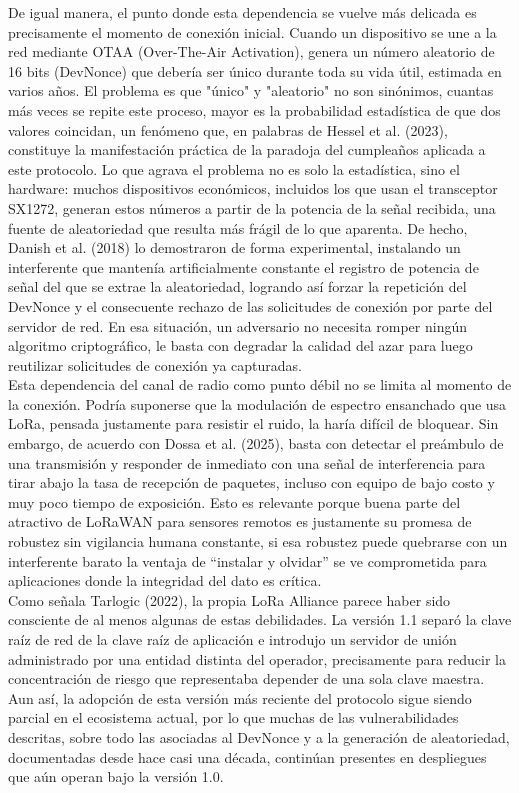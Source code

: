 \documentclass[12pt,a4paper]{article}
\begin{document}
	De igual manera, el punto donde esta dependencia se vuelve más delicada es precisamente el momento de conexión inicial. Cuando un dispositivo se une a la red mediante OTAA (Over-The-Air Activation), genera un número aleatorio de 16 bits (DevNonce) que debería ser único durante toda su vida útil, estimada en varios años. El problema es que "único" y "aleatorio" no son sinónimos, cuantas más veces se repite este proceso, mayor es la probabilidad estadística de que dos valores coincidan, un fenómeno que, en palabras de Hessel et al. (2023), constituye la manifestación práctica de la paradoja del cumpleaños aplicada a este protocolo. Lo que agrava el problema no es solo la estadística, sino el hardware: muchos dispositivos económicos, incluidos los que usan el transceptor SX1272, generan estos números a partir de la potencia de la señal recibida, una fuente de aleatoriedad que resulta más frágil de lo que aparenta. De hecho, Danish et al. (2018) lo demostraron de forma experimental, instalando un interferente que mantenía artificialmente constante el registro de potencia de señal del que se extrae la aleatoriedad, logrando así forzar la repetición del DevNonce y el consecuente rechazo de las solicitudes de conexión por parte del servidor de red. En esa situación, un adversario no necesita romper ningún algoritmo criptográfico, le basta con degradar la calidad del azar para luego reutilizar solicitudes de conexión ya capturadas.\\

	Esta dependencia del canal de radio como punto débil no se limita al momento de la conexión. Podría suponerse que la modulación de espectro ensanchado que usa LoRa, pensada justamente para resistir el ruido, la haría difícil de bloquear. Sin embargo, de acuerdo con Dossa et al. (2025), basta con detectar el preámbulo de una transmisión y responder de inmediato con una señal de interferencia para tirar abajo la tasa de recepción de paquetes, incluso con equipo de bajo costo y muy poco tiempo de exposición. Esto es relevante porque buena parte del atractivo de LoRaWAN para sensores remotos es justamente su promesa de robustez sin vigilancia humana constante, si esa robustez puede quebrarse con un interferente barato la ventaja de “instalar y olvidar” se ve comprometida para aplicaciones donde la integridad del dato es crítica.\\

	Como señala Tarlogic (2022), la propia LoRa Alliance parece haber sido consciente de al menos algunas de estas debilidades. La versión 1.1 separó la clave raíz de red de la clave raíz de aplicación e introdujo un servidor de unión administrado por una entidad distinta del operador, precisamente para reducir la concentración de riesgo que representaba depender de una sola clave maestra. Aun así, la adopción de esta versión más reciente del protocolo sigue siendo parcial en el ecosistema actual, por lo que muchas de las vulnerabilidades descritas, sobre todo las asociadas al DevNonce y a la generación de aleatoriedad, documentadas desde hace casi una década, continúan presentes en despliegues que aún operan bajo la versión 1.0.
\end{document}
